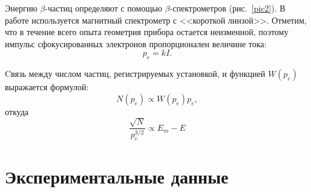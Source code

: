 \documentclass[a4paper, 12pt]{article}
\begin{document}
	Энергию $\beta$-частиц определяют с помощью $\beta$-спектрометров (рис.~\ref{pic2}). В работе используется магнитный спектрометр с <<короткой линзой>>. Отметим, что в течение всего опыта геометрия прибора остается неизменной, поэтому импульс сфокусированных электронов пропорционален величине тока:
	\begin{equation}
		\label{eq:pkI}
		\tag{$\star$}
		p_e = kI.
	\end{equation}

	Cвязь между числом частиц, регистрируемых установкой, и функцией $W(p_e)$ выражается формулой:
	\begin{equation*}
		N(p_e) \propto W(p_e)p_e,
	\end{equation*}
	откуда
	\begin{equation}
		\label{eq:fermi}
		\tag{$\star \star$}
		\frac{\sqrt{N}}{p_e^{3/2}} \propto E_m - E
	\end{equation}
	
	
	\section*{Экспериментальные данные}
		
\end{document}
